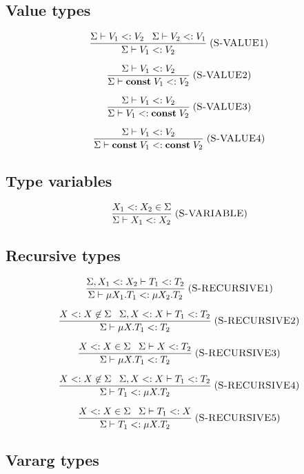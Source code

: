 \documentclass[12pt]{article}
\newcommand{\Const}{\mathbf{const}}
\newcommand{\mylabel}[1]{\; (\textsc{#1})}
\newcommand{\subtype}{<:}
\newcommand{\senv}{\Sigma}
\begin{document}
\subsection{Value types}

\[
\frac{\senv \vdash V_{1} \subtype V_{2} \;\;\;
      \senv \vdash V_{2} \subtype V_{1}}
     {\senv \vdash V_{1} \subtype V_{2}}
\mylabel{S-VALUE1}
\]

\[
\frac{\senv \vdash V_{1} \subtype V_{2}}
     {\senv \vdash \Const \; V_{1} \subtype V_{2}}
\mylabel{S-VALUE2}
\]

\[
\frac{\senv \vdash V_{1} \subtype V_{2}}
     {\senv \vdash V_{1} \subtype \Const \; V_{2}}
\mylabel{S-VALUE3}
\]

\[
\frac{\senv \vdash V_{1} \subtype V_{2}}
     {\senv \vdash \Const \; V_{1} \subtype \Const \; V_{2}}
\mylabel{S-VALUE4}
\]

\subsection{Type variables}

\[
\frac{X_{1} \subtype X_{2} \in \senv}
     {\senv \vdash X_{1} \subtype X_{2}}
\mylabel{S-VARIABLE}
\]

\subsection{Recursive types}

\[
\frac{\senv, X_{1} \subtype X_{2} \vdash T_{1} \subtype T_{2}}
     {\senv \vdash \mu X_{1}.T_{1} \subtype \mu X_{2}.T_{2}}
\mylabel{S-RECURSIVE1}
\]

\[
\frac{X \subtype X \not\in \senv \;\;\;
      \senv, X \subtype X \vdash T_{1} \subtype T_{2}}
     {\senv \vdash \mu X.T_{1} \subtype T_{2}}
\mylabel{S-RECURSIVE2}
\]

\[
\frac{X \subtype X \in \senv \;\;\;
      \senv \vdash X \subtype T_{2}}
     {\senv \vdash \mu X.T_{1} \subtype T_{2}}
\mylabel{S-RECURSIVE3}
\]

\[
\frac{X \subtype X \not\in \senv \;\;\;
      \senv, X \subtype X \vdash T_{1} \subtype T_{2}}
     {\senv \vdash T_{1} \subtype \mu X.T_{2}}
\mylabel{S-RECURSIVE4}
\]

\[
\frac{X \subtype X \in \senv \;\;\;
      \senv \vdash T_{1} \subtype X}
     {\senv \vdash T_{1} \subtype \mu X.T_{2}}
\mylabel{S-RECURSIVE5}
\]

\subsection{Vararg types}
\end{document}
